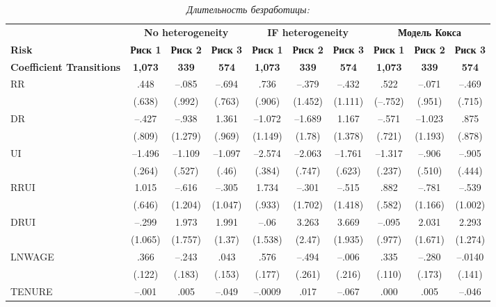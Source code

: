 \begin{sidewaystable}[!htbp]\caption{\textit{Длительность безработицы: }}\label{tab:19.3}
    \begin{center}
\begin{tabular}{lccccccccc}
\hline \hline
&\multicolumn{3}{c}{\textbf{No heterogeneity}}&\multicolumn{3}{c}{\textbf{IF heterogeneity}}&\multicolumn{3}{c}{\textbf{Модель Кокса}}\\
\cmidrule(r){2-4}\cmidrule(r){5-7}\cmidrule(r){8-10}
\textbf{Risk}                    &\textbf{Риск 1} &\textbf{Риск 2} &\textbf{Риск 3} &\textbf{Риск 1} &\textbf{Риск 2} &\textbf{Риск 3} &\textbf{Риск 1} &\textbf{Риск 2} &\textbf{Риск 3}\\
\textbf{Coefficient Transitions} &\textbf{1,073}  &\textbf{339}    &\textbf{574}    &\textbf{1,073}  &\textbf{339}    &\textbf{574} &\textbf{1,073}  &\textbf{339}    &\textbf{574}\\
\hline
RR                  &.448   &--.085 &--.694 &.736   &--.379 &--.432 &.522   &--.071 &--.469 \\
                    &(.638) &(.992) &(.763) &(.906) &(1.452)&(1.111)&(--.752)&(.951)&(.715) \\
DR                  &--.427 &--.938 &1.361  &--1.072&--1.689&1.167  &--.571 &--1.023&.875 \\
                    &(.809) &(1.279)&(.969) &(1.149)&(1.78) &(1.378)&(.721) &(1.193)&(.878) \\
UI                  &--1.496&--1.109&--1.097&--2.574&--2.063&--1.761&--1.317&--.906 &--.905 \\
                    &(.264) &(.527) &(.46)  &(.384) &(.747) &(.623) &(.237) &(.510) &(.444) \\
RRUI                &1.015  &--.616 &--.305 &1.734  &--.301 &--.515 &.882   &--.781 &--.539 \\
                    &(.646) &(1.204)&(1.047)&(.933) &(1.702)&(1.418)&(.582) &(1.166)&(1.002) \\
DRUI                &--.299 &1.973  &1.991  &--.06  &3.263  &3.669  &--.095 &2.031  &2.293 \\
                    &(1.065)&(1.757)&(1.37) &(1.538)&(2.47) &(1.935)&(.977) &(1.671)&(1.274) \\
LNWAGE              &.366   &--.243 &.043   &.576   &--.494 &--.006 &.335   &--.280 &--.0140 \\
                    &(.122) &(.183) &(.153) &(.177) &(.261) &(.216) &(.110) &(.173) &(.141) \\
TENURE              &--.001 &.005   &--.049 &--.0009&.017   &--.067 &.000   &.005   &--.046 \\

\end{tabular}
\end{center}
\end{sidewaystable}
